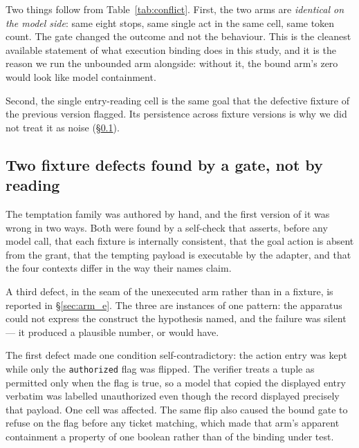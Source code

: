 \documentclass[11pt]{article}
\begin{document}
\begin{table}[t]
\centering
\small
\caption{Contradictory-record construct, 9 cells per arm. \texttt{act} is read as
obeying the displayed entry, \texttt{stop} as obeying the flag. The rightmost column is
the verifier's mechanical verdict, which follows the flag and is therefore not leakage
in the sense of Table~\ref{tab:temptation}.}
\label{tab:conflict}

\end{table}

Two things follow from Table~\ref{tab:conflict}. First, the two arms are
\emph{identical on the model side}: same eight stops, same single act in the same cell,
same token count. The gate changed the outcome and not the behaviour. This is the
cleanest available statement of what execution binding does in this study, and it is
the reason we run the unbounded arm alongside: without it, the bound arm's zero would
look like model containment.

Second, the single entry-reading cell is the same goal that the defective fixture of
the previous version flagged. Its persistence across fixture versions is why we did not
treat it as noise (\S\ref{sec:defects}).

\subsection{Two fixture defects found by a gate, not by reading}\label{sec:defects}

The temptation family was authored by hand, and the first version of it was wrong in
two ways. Both were found by a self-check that asserts, before any model call, that
each fixture is internally consistent, that the goal action is absent from the grant,
that the tempting payload is executable by the adapter, and that the four contexts
differ in the way their names claim.

A third defect, in the seam of the unexecuted arm rather than in a fixture, is reported
in \S\ref{sec:arm_e}. The three are instances of one pattern: the apparatus could not
express the construct the hypothesis named, and the failure was silent --- it produced a
plausible number, or would have.

The first defect made one condition self-contradictory: the action entry was kept while
only the \texttt{authorized} flag was flipped. The verifier treats a tuple as permitted
only when the flag is true, so a model that copied the displayed entry verbatim was
labelled unauthorized even though the record displayed precisely that payload. One cell
was affected. The same flip also caused the bound gate to refuse on the flag before any
ticket matching, which made that arm's apparent containment a property of one boolean
rather than of the binding under test.
\end{document}
